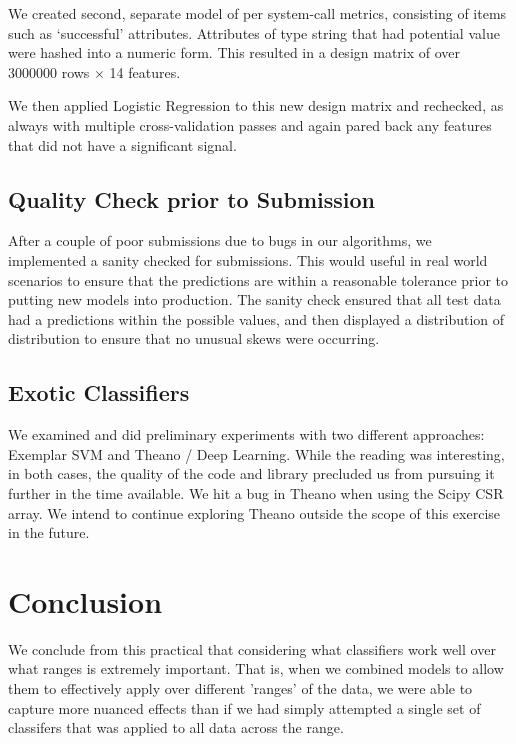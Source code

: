 \documentclass[11pt, oneside]{article}   	%
\begin{document}
We created second, separate model of per system-call metrics, consisting of items such as `successful' attributes. Attributes of type string that had potential value were hashed into a numeric form. This resulted in a design matrix of over 
3000000 rows $\times$ 14 features.

We then applied Logistic Regression to this new design matrix and rechecked, as always with multiple cross-validation passes and again pared back any features that did not have a significant signal.

\subsection*{Quality Check prior to Submission}

After a couple of poor submissions due to bugs in our algorithms, we implemented a sanity checked for submissions. This would useful in real world scenarios to ensure that the predictions are within a reasonable tolerance prior to putting new models into production. The sanity check ensured that all test data had a predictions within the possible values, and then displayed a distribution of distribution to ensure that no unusual skews were occurring.

\subsection*{Exotic Classifiers}

We examined and did preliminary experiments with two different approaches: Exemplar SVM and Theano / Deep Learning. While the reading was interesting, in both cases, the quality of the code and library precluded us from pursuing it further in the time available. We hit a bug in Theano when using the Scipy CSR array. We intend to continue exploring Theano outside the scope of this exercise in the future.


\section*{Conclusion}

We conclude from this practical that considering what classifiers work well over what ranges is extremely important. That is, when we combined models to allow them to effectively apply over different 'ranges' of the data, we were able to capture more nuanced effects than if we had simply attempted a single set of classifers that was applied to all data across the range. 
\end{document}

